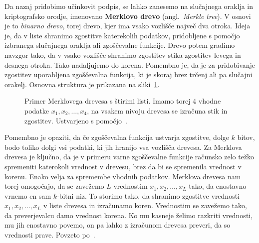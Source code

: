 \documentclass[isrm2, tisk]{fmfdelo}
\begin{document}
Da nazaj pridobimo učinkovit podpis, se lahko zanesemo na slučajnega oraklja in kriptografsko 
orodje, imenovano \textbf{Merklovo drevo} (angl.\ \textit{Merkle tree}). V osnovi je to 
\textit{binarno drevo}, torej drevo, kjer ima vsako vozlišče največ dva otroka. Ideja je, da v liste 
shranimo zgostitve katerekolih podatkov, pridobljene s pomočjo izbranega slučajnega oraklja ali zgoščevalne 
funkcije. Drevo potem gradimo navzgor tako, da v vsako vozlišče shranimo zgostitev stika zgostitev levega in desnega 
otroka. Tako nadaljujemo do korena. Pomembno je, da je za pridobivanje zgostitev uporabljena zgoščevalna 
funkcija, ki je skoraj brez trčenj ali pa slučajni orakelj. Osnovna 
struktura je prikazana na sliki~\ref{fig:merkle}.
\begin{figure}[ht]
  \centering
  \caption[Merklovo drevo.]{Primer Merklovega drevesa s štirimi listi. Imamo torej $4$ vhodne podatke
    $x_1, x_2, \dots, x_4$, na vsakem nivoju drevesa se izračuna stik in zgostitev. Ustvarjeno s 
    pomočjo~\cite{SOtikz}.}
  \label{fig:merkle}
\end{figure}

Pomembno je opaziti, da če zgoščevalna funkcija ustvarja zgostitve, dolge $k$ bitov, bodo toliko
dolgi vsi podatki, ki jih hranijo vsa vozlišča drevesa. Za Merklova drevesa je ključno, da je v primeru
varne zgoščevalne funkcije računsko zelo težko spremeniti katerokoli vrednost v drevesu, brez da bi se
spremenila vrednost v korenu. Enako velja za spremembe vhodnih podatkov. Merklova drevesa nam torej
omogočajo, da se zavežemo $L$ vrednostim $x_1, x_2, \dots, x_L$ tako, da enostavno vrnemo en sam
$k$-bitni niz. To storimo tako, da shranimo zgostitve vrednosti $x_1, x_2, \dots, x_L$ v liste drevesa
in izračunamo koren. Vrednostim se zavežemo tako, da preverjevalcu damo vrednost korena. Ko mu kasneje
želimo razkriti vrednosti, mu jih enostavno povemo, on pa lahko z izračunom drevesa preveri, da so
vrednosti prave. Povzeto po~\cite{micali2000csproofs}.
\end{document}
